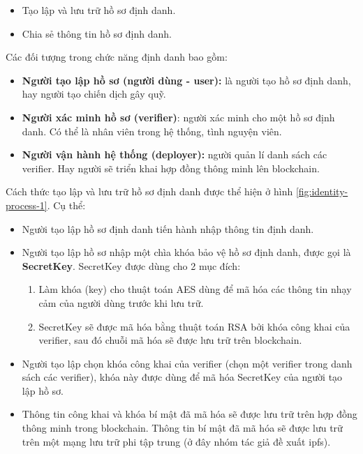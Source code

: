 \documentclass[../main-report.tex]{subfiles}
\begin{document}
\begin{itemize}
\item Tạo lập và lưu trữ hồ sơ định danh.
\item Chia sẻ thông tin hồ sơ định danh.
\end{itemize}

Các đối tượng trong chức năng định danh bao gồm:

\begin{itemize}
\item \textbf{Người tạo lập hồ sơ (người dùng - user):} là người tạo hồ sơ định danh, hay người tạo chiến dịch gây quỹ.
\item \textbf{Người xác minh hồ sơ (verifier)}: người xác minh cho một hồ sơ định danh. Có thể là nhân viên trong hệ thống, tình nguyện viên.
\item \textbf{Người vận hành hệ thống (deployer):} người quản lí danh sách các verifier. Hay người sẽ triển khai hợp đồng thông minh lên \gls{blockchain}.
\end{itemize}

Cách thức tạo lập và lưu trữ hồ sơ định danh được thể hiện ở hình \ref{fig:identity-process-1}. Cụ thể:

\begin{itemize}
\item Người tạo lập hồ sơ định danh tiến hành nhập thông tin định danh.
\item Người tạo lập hồ sơ nhập một chìa khóa bảo vệ hồ sơ định danh, được gọi là \textbf{SecretKey}. SecretKey được dùng cho 2 mục đích:
\begin{enumerate}[label=(\roman*)]
\item Làm khóa (key) cho thuật toán AES dùng để mã hóa các thông tin nhạy cảm của người dùng trước khi lưu trữ.
\item SecretKey sẽ được mã hóa bằng thuật toán RSA bởi khóa công khai của verifier, sau đó chuỗi mã hóa sẽ được lưu trữ trên \gls{blockchain}.
\end{enumerate}
\item Người tạo lập chọn khóa công khai của verifier (chọn một verifier trong danh sách các verifier), khóa này được dùng để mã hóa SecretKey của người tạo lập hồ sơ.
\item Thông tin công khai và khóa bí mật đã mã hóa sẽ được lưu trữ trên hợp đồng thông minh trong blockchain. Thông tin bí mật đã mã hóa sẽ được lưu trữ trên một mạng lưu trữ phi tập trung (ở đây nhóm tác giả đề xuất \acrshort{ipfs}).
\end{itemize}
\end{document}
